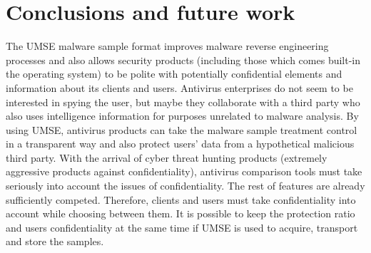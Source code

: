 \chapter{Conclusions and future work}

The UMSE malware sample format improves malware reverse engineering processes\cite{ContextBasedMalware}\cite{LearningFromContext}\cite{ResidentViruses}\cite{FilelessAttacks}\cite{AdvacedVolatileThreat}
and also allows security products (including those which comes built-in the
operating system) to be polite with potentially confidential elements and
information about its clients and users.  Antivirus enterprises do not seem to
be interested in spying the user\cite{BBCMarcinKleczynski}, but maybe they collaborate with a third
party who also uses intelligence information for purposes unrelated to malware
analysis\cite{KasperskyBoundariesOfTrust}. By using UMSE, antivirus products can take the malware sample
treatment control in a transparent way and also protect users' data from a
hypothetical malicious third party.  With the arrival of cyber threat hunting
products (extremely aggressive products against confidentiality), antivirus
comparison tools must take seriously into account the issues of
confidentiality. The rest of features are already sufficiently competed.
Therefore, clients and users must take confidentiality into account while
choosing between them.  It is possible to keep the protection ratio and users
confidentiality at the same time if UMSE is used to acquire, transport and
store the samples.

